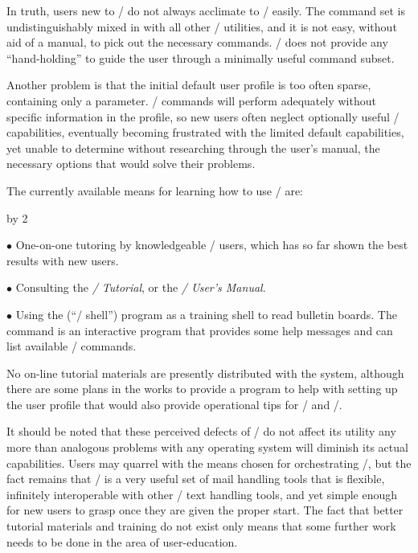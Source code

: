 In truth,
users new to \unix/ do not always acclimate to \MH/ easily.
The command set is undistinguishably mixed in with all other \unix/
utilities, and it is not easy, without aid of a manual,
to pick out the necessary commands.
\MH/ does not provide any ``hand-holding'' to guide
the user through a minimally useful command subset.

Another problem is that the initial default user profile is too often sparse,
containing only a  parameter.
\MH/ commands will perform adequately without specific information
in the profile,
so new users often neglect optionally useful \MH/ capabilities,
eventually becoming frustrated with the limited default capabilities,
yet unable to determine without researching through the user's manual,
the necessary options that would solve their problems.

The currently available means for learning how to use \MH/ are:
\medskip
{\advance\leftskip by 2\parindent
\item{$\bullet$}
One-on-one tutoring by knowledgeable \MH/ users,
which has so far shown the best results with new users.

\item{$\bullet$}
Consulting the {\it \MH/ Tutorial\/}\cite{MRose84b},
or the {\it \MH/ User's Manual\/}\cite{MRose85a}.

\item{$\bullet$}
Using the  (``\MH/ shell'') program as a training shell to read
bulletin boards.
The  command is an interactive program that provides some help
messages and can list available \MH/ commands.
\par}
\medskip

\noindent
No on-line tutorial materials are presently distributed with the 
system, although there are some plans in the works to provide a program
to help with setting up the user profile that would also provide
operational tips for \MH/ and \unix/. 

It should be noted that these perceived defects of \MH/ do not affect its
utility any more than analogous problems with any operating system
will diminish its actual capabilities.
Users may quarrel with the means chosen for orchestrating \MH/,
but the fact remains that \MH/ is a very
useful set of mail handling tools that is flexible,
infinitely interoperable with other \unix/ text handling tools,
and yet simple enough for new users to grasp once they are given the 
proper start.
The fact that better tutorial materials and training do not exist only means
that some further work needs to be done in the area of user-education.

